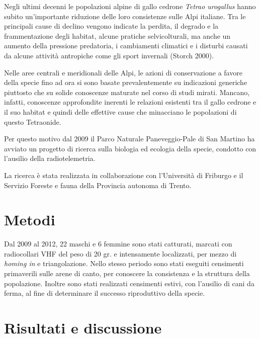 {Negli ultimi decenni le popolazioni alpine
di gallo cedrone }\textit{{Tetrao
urogallus}}{ hanno subito
un{\textquoteright}importante riduzione delle loro consistenze sulle
Alpi italiane. Tra le principali cause di declino vengono indicate la
perdita, il degrado e la frammentazione degli habitat, alcune pratiche
selvicolturali, ma anche un aumento della pressione predatoria, i
cambiamenti climatici e i disturbi causati da alcune attivit\`a
antropiche come gli sport invernali (Storch 2000).}

{Nelle aree centrali e meridionali delle
Alpi, le azioni di conservazione a favore della specie fino ad ora
}si\textcolor{red}{ }{sono basate
prevalentemente su indicazioni generiche piuttosto che su solide
conoscenze maturate nel corso di studi mirati. Mancano, infatti,
conoscenze approfondite inerenti le relazioni esistenti tra il gallo
cedrone e il suo habitat e quindi delle effettive cause che minacciano
le popolazioni di questo Tetraonide.}

{Per questo motivo dal 2009 il Parco
Naturale Paneveggio-Pale di San Martino ha avviato un progetto di
ricerca sulla biologia ed ecologia della specie, condotto con
l{\textquoteright}ausilio della radiotelemetria.}

{La ricerca \`e stata realizzata in
collaborazione con l{\textquoteright}Universit\`a di Friburgo e il
Servizio Foreste e fauna della Provincia autonoma di Trento.}

\section*{Metodi}

{Dal 2009 al 2012, 22 maschi e 6 femmine
sono stati catturati, marcati con radiocollari VHF del peso di 20 gr. 
e intensamente localizzati, per mezzo di
}\textit{{homing
in}}{ e triangolazione. Nello stesso
periodo sono stati eseguiti censimenti primaverili sulle arene di
canto, per conoscere la consistenza e la struttura della popolazione.
Inoltre sono stati realizzati censimenti estivi, con
l{\textquoteright}ausilio di cani da ferma, al fine di determinare il
successo riproduttivo della specie.}

\section*{Risultati e discussione}

